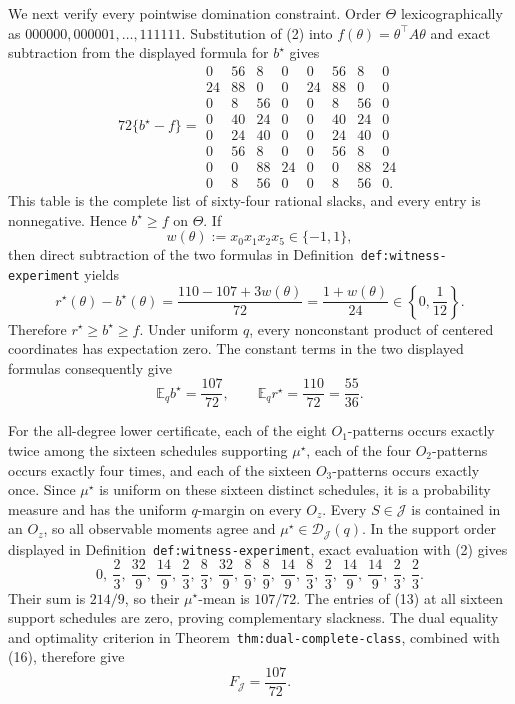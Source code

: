 We next verify every pointwise domination constraint.  Order \(\Theta\) lexicographically as \(000000,000001,\ldots,111111\).  Substitution of (2) into \(f(\theta)=\theta^\top A\theta\) and exact subtraction from the displayed formula for \(b^\star\) gives
\[
72\{b^\star-f\}=
\begin{array}{rrrrrrrr}
0&56&8&0&0&56&8&0\\
24&88&0&0&24&88&0&0\\
0&8&56&0&0&8&56&0\\
0&40&24&0&0&40&24&0\\
0&24&40&0&0&24&40&0\\
0&56&8&0&0&56&8&0\\
0&0&88&24&0&0&88&24\\
0&8&56&0&0&8&56&0.
\end{array}
\tag{13}
\]
This table is the complete list of sixty-four rational slacks, and every entry is nonnegative.  Hence \(b^\star\ge f\) on \(\Theta\).  If
\[
w(\theta):=x_0x_1x_2x_5\in\{-1,1\},
\tag{14}
\]
then direct subtraction of the two formulas in Definition~\texttt{def:witness-experiment} yields
\[
r^\star(\theta)-b^\star(\theta)
=\frac{110-107+3w(\theta)}{72}
=\frac{1+w(\theta)}{24}
\in\left\{0,\frac1{12}\right\}.
\tag{15}
\]
Therefore \(r^\star\ge b^\star\ge f\).  Under uniform \(q\), every nonconstant product of centered coordinates has expectation zero.  The constant terms in the two displayed formulas consequently give
\[
\mathbb E_q b^\star=\frac{107}{72},
\qquad
\mathbb E_q r^\star=\frac{110}{72}=\frac{55}{36}.
\tag{16}
\]

For the all-degree lower certificate, each of the eight \(O_1\)-patterns occurs exactly twice among the sixteen schedules supporting \(\mu^\star\), each of the four \(O_2\)-patterns occurs exactly four times, and each of the sixteen \(O_3\)-patterns occurs exactly once.  Since \(\mu^\star\) is uniform on these sixteen distinct schedules, it is a probability measure and has the uniform \(q\)-margin on every \(O_z\).  Every \(S\in\mathcal J\) is contained in an \(O_z\), so all observable moments agree and \(\mu^\star\in\mathcal D_{\mathcal J}(q)\).  In the support order displayed in Definition~\texttt{def:witness-experiment}, exact evaluation with (2) gives
\[
0,\ \frac23,\ \frac{32}{9},\ \frac{14}{9},\ \frac23,\ \frac83,
\ \frac{32}{9},\ \frac89,\ \frac89,\ \frac{14}{9},\ \frac83,\ \frac23,
\ \frac{14}{9},\ \frac{14}{9},\ \frac23,\ \frac23.
\tag{17}
\]
Their sum is \(214/9\), so their \(\mu^\star\)-mean is \(107/72\).  The entries of (13) at all sixteen support schedules are zero, proving complementary slackness.  The dual equality and optimality criterion in Theorem~\texttt{thm:dual-complete-class}, combined with (16), therefore give
\[
F_{\mathcal J}=\frac{107}{72}.
\tag{18}
\]

